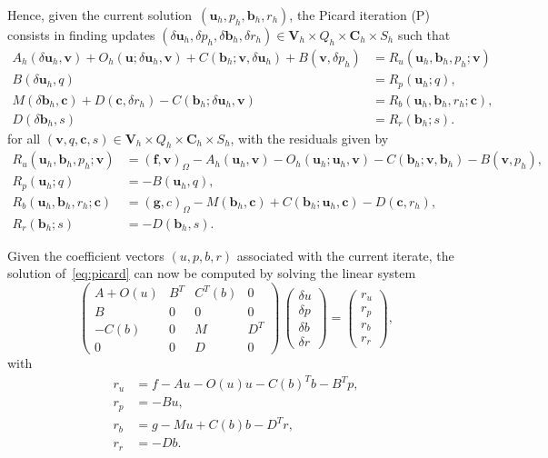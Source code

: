 \documentclass{siamltex}
\newcommand{\uu}[1]{\boldsymbol #1}                     %
\begin{document}
Hence, given the current solution~$(\uu{u}_h,p_h,\uu{b}_h,r_h)$, the Picard iteration (P) consists in finding
updates $(\delta \uu{u}_h,\delta p_h,\delta \uu{b}_h,\delta r_h)\in\uu{V}_h\times Q_h \times\uu{C}_h\times S_h$ such that
\begin{equation}
\label{eq:picard}
\begin{split}
A_h(\delta\uu{u}_h, \uu{v}) +O_h(\uu{u};\delta\uu{u}_h,\uu{v})+ C(\uu{b}_h;\uu{v},\delta \uu{u}_h) + B(\uu{v}, \delta p_h) & = R_u(\uu{u}_h,\uu{b}_h,p_h;\uu{v})\\[.1cm]
B(\delta\uu{u}_h,q)&= R_p(\uu{u}_h;q), \\[.1cm]
M(\delta \uu{b}_h,\uu{c})+
D(\uu{c},\delta r_h)-C(\uu{b}_h;\delta \uu{u}_h,\uu{v})&= R_b(\uu{u}_h,\uu{b}_h,r_h;\uu{c}),\\[.1cm]
D(\delta \uu{b}_h,s)&= R_r(\uu{b}_h;s).
\end{split}
\end{equation}
for all $(\uu{v},q,\uu{c},s)\in\uu{V}_h\times Q_h\times \uu{C}_h\times S_h$, with the residuals given by
\begin{align*}
 R_u(\uu{u}_h,\uu{b}_h,p_h;\uu{v})&=(\uu{f}, \uu{v})_\Omega-A_h(\uu{u}_h,\uu{v})
-  O_h(\uu{u}_h;\uu{u}_h,\uu{v})  - C(\uu{b}_h;\uu{v},\uu{b}_h)-B(\uu{v},p_h),\\[.1cm]
R_p(\uu{u}_h;q)&=-B(\uu{u}_h,q),\\[.1cm]
 R_b(\uu{u}_h,\uu{b}_h,r_h;\uu{c})&=(\uu{g,c})_\Omega -M(\uu{b}_h,\uu{c})
+ C(\uu{b}_h;\uu{u}_h,\uu{c})-D(\uu{c},r_h),\\[.1cm]
R_r(\uu{b}_h;s)&=-D(\uu{b}_h,s).
\end{align*}


Given the coefficient vectors $(u,p,b,r)$ associated with the current iterate, the solution of~\eqref{eq:picard} can now be computed by solving the linear system
\begin{equation}
\label{eq:mhd_saddle}
\left(
\begin{array}{cccc}
A+O(u) & B^T & C^T(b) & 0\\
B & 0 & 0 & 0 \\
-C(b) & 0 & M & D^T\\
0 & 0 & D & 0
\end{array}
\right)
\,
\left(
\begin{array}{c}
\delta u\\
\delta p\\
\delta b\\
\delta r
\end{array}
\right)  =
\begin{pmatrix}
r_u \\
r_p\\
r_b\\
r_r
\end{pmatrix},
\end{equation}
with
\begin{align*}
r_u &= f- Au -O(u) u - C(b)^T b- B^T p,\\[0.1cm]
r_p &=-B u,\\[0.1cm]
r_b &=g-Mu+C(b)b-D^T r,\\[0.1cm]
r_r &=-D b.
\end{align*}
\end{document}

